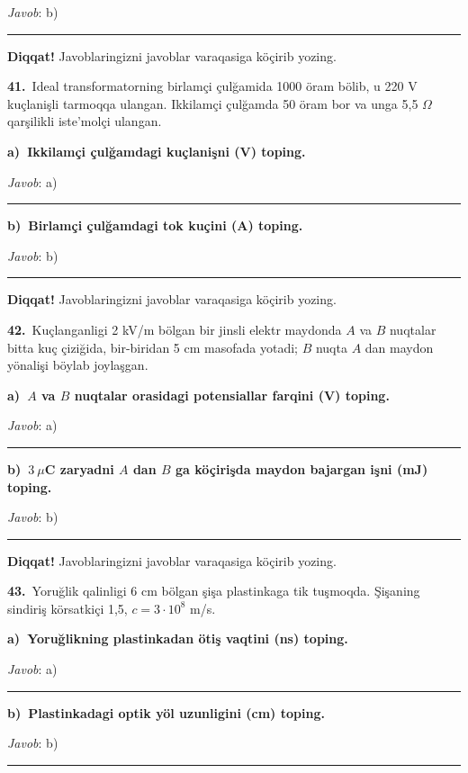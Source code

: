 \documentclass[11pt,a4paper]{article}
\newcommand{\blank}{\rule{5cm}{0.4pt}}
\begin{document}
\noindent\textit{Javob}: b)\ \blank\par
\medskip\noindent\textbf{Diqqat!} Javoblaringizni javoblar varaqasiga köçirib yozing.\par\vspace{10pt}
\noindent\textbf{41.}\ Ideal transformatorning birlamçi çulğamida 1000 öram bölib, u 220 V kuçlanişli tarmoqqa ulangan. Ikkilamçi çulğamda 50 öram bor va unga 5,5 $\Omega$ qarşilikli iste’molçi ulangan.\par\smallskip
\medskip\noindent\textbf{a)\ Ikkilamçi çulğamdagi kuçlanişni (V) toping.}\par
\noindent\textit{Javob}: a)\ \blank\par
\medskip\noindent\textbf{b)\ Birlamçi çulğamdagi tok kuçini (A) toping.}\par
\noindent\textit{Javob}: b)\ \blank\par
\medskip\noindent\textbf{Diqqat!} Javoblaringizni javoblar varaqasiga köçirib yozing.\par\vspace{10pt}
\noindent\textbf{42.}\ Kuçlanganligi 2 kV/m bölgan bir jinsli elektr maydonda $A$ va $B$ nuqtalar bitta kuç çiziğida, bir-biridan 5 cm masofada yotadi; $B$ nuqta $A$ dan maydon yönalişi böylab joylaşgan.\par\smallskip
\medskip\noindent\textbf{a)\ $A$ va $B$ nuqtalar orasidagi potensiallar farqini (V) toping.}\par
\noindent\textit{Javob}: a)\ \blank\par
\medskip\noindent\textbf{b)\ $3\ \mu$C zaryadni $A$ dan $B$ ga köçirişda maydon bajargan işni (mJ) toping.}\par
\noindent\textit{Javob}: b)\ \blank\par
\medskip\noindent\textbf{Diqqat!} Javoblaringizni javoblar varaqasiga köçirib yozing.\par\vspace{10pt}
\noindent\textbf{43.}\ Yoruğlik qalinligi 6 cm bölgan şişa plastinkaga tik tuşmoqda. Şişaning sindiriş körsatkiçi 1,5, $c=3\cdot10^8$ m/s.\par\smallskip
\medskip\noindent\textbf{a)\ Yoruğlikning plastinkadan ötiş vaqtini (ns) toping.}\par
\noindent\textit{Javob}: a)\ \blank\par
\medskip\noindent\textbf{b)\ Plastinkadagi optik yöl uzunligini (cm) toping.}\par
\noindent\textit{Javob}: b)\ \blank\par
\end{document}
